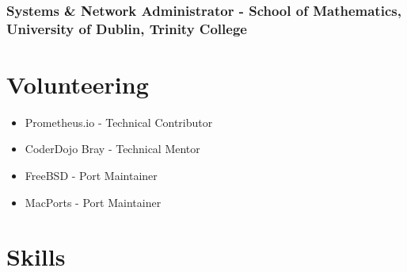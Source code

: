 \documentclass[a4paper, 10pt] {article}
\begin{document}
\subsubsection*{Systems \& Network Administrator - School of Mathematics, University of Dublin, Trinity College}

\hrulefill

\section*{Volunteering}

\begin{itemize}
  \item Prometheus.io - Technical Contributor
  \item CoderDojo Bray - Technical Mentor
  \item FreeBSD - Port Maintainer
  \item MacPorts - Port Maintainer
\end{itemize}

\hrulefill

\section*{Skills}
\end{document}
